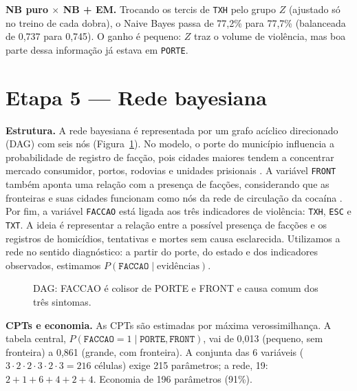 \documentclass[10pt,a4paper,twocolumn]{article}
\begin{document}
\textbf{NB puro $\times$ NB + EM.} Trocando os tercis de \texttt{TXH} pelo grupo $Z$ (ajustado só no
treino de cada dobra), o Naive Bayes passa de 77,2\% para 77,7\% (balanceada de 0,737 para 0,745).
O ganho é pequeno: $Z$ traz o volume de violência, mas boa parte dessa informação já estava em
\texttt{PORTE}.

\section{Etapa 5 --- Rede bayesiana}
\textbf{Estrutura.} A rede bayesiana é representada por um grafo acíclico direcionado (DAG) com seis nós (Figura~\ref{fig:dag}). No modelo, o porte do município influencia a probabilidade de registro de facção, pois cidades maiores tendem a concentrar mercado consumidor, portos, rodovias e unidades prisionais \cite{siq}. A variável \texttt{FRONT} também aponta uma relação com a presença de facções, considerando que as fronteiras e suas cidades funcionam como nós da rede de circulação da cocaína \cite{couto2020}. Por fim, a variável \texttt{FACCAO} está ligada aos três indicadores de violência: \texttt{TXH}, \texttt{ESC} e \texttt{TXT}. A ideia é representar a relação entre a possível presença de facções e os registros de homicídios, tentativas e mortes sem causa esclarecida. Utilizamos a rede no sentido diagnóstico: a partir do porte, do estado e dos indicadores observados, estimamos $P(\texttt{FACCAO}\mid\text{evidências})$.

\begin{figure}[H]\centering
{}
\caption{DAG: FACCAO é colisor de PORTE e FRONT e causa comum dos três sintomas.}\label{fig:dag}\end{figure}

\textbf{CPTs e economia.} As CPTs são estimadas por máxima verossimilhança. A tabela central,
$P(\texttt{FACCAO}{=}1\mid\texttt{PORTE},\texttt{FRONT})$, vai de 0,013 (pequeno, sem fronteira) a
0,861 (grande, com fronteira). A conjunta das 6 variáveis ($3\cdot2\cdot2\cdot3\cdot2\cdot3=216$
células) exige 215 parâmetros; a rede, 19: $2+1+6+4+2+4$. Economia de 196 parâmetros (91\%).
\end{document}
